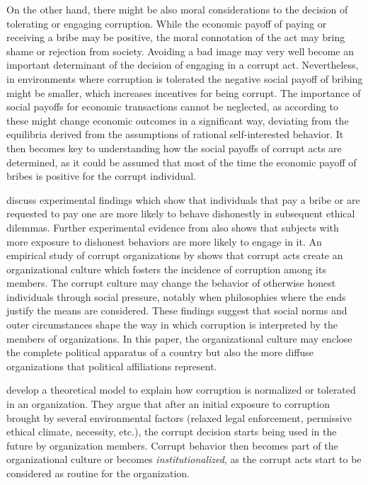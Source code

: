 \documentclass[12pt,a4]{article}\usepackage[]{graphicx}\usepackage[]{xcolor}
\begin{document}
On the other hand, there might be also moral considerations to the decision of tolerating or engaging corruption. While the economic payoff of paying or receiving a bribe may be positive, the moral connotation of the act may bring shame or rejection from society. Avoiding a bad image may very well become an important determinant of the decision of engaging in a corrupt act. Nevertheless, in environments where corruption is tolerated the negative social payoff of bribing might be smaller, which increases incentives for being corrupt. The importance of social payoffs for economic transactions cannot be neglected, as according to \textcite{Akerlof.1980} these might change economic outcomes in a significant way, deviating from the equilibria derived from the assumptions of rational self-interested behavior. It then becomes key to understanding how the social payoffs of corrupt acts are determined, as it could be assumed that most of the time the economic payoff of bribes is positive for the corrupt individual. 

\textcite{Ariely.2019} discuss experimental findings which show that individuals that pay a bribe or are requested to pay one are more likely to behave dishonestly in subsequent ethical dilemmas. Further experimental evidence from \textcite{Gino.2009} also shows that subjects with more exposure to dishonest behaviors are more likely to engage in it. An empirical study of corrupt organizations by \textcite{Campbell.2014} shows that corrupt acts create an organizational culture which fosters the incidence of corruption among its members. The corrupt culture may change the behavior of otherwise honest individuals through social pressure, notably when philosophies where the ends justify the means are considered. These findings suggest that social norms and outer circumstances shape the way in which corruption is interpreted by the members of organizations. In this paper, the organizational culture may enclose the complete political apparatus of a country but also the more diffuse organizations that political affiliations represent. 

\textcite{Ashforth.2003} develop a theoretical model to explain how corruption is normalized or tolerated in an organization. They argue that after an initial exposure to corruption brought by several environmental factors (relaxed legal enforcement, permissive ethical climate, necessity, etc.), the corrupt decision starts being used in the future by organization members. Corrupt behavior then becomes part of the organizational culture or becomes \textit{institutionalized}, as the corrupt acts start to be considered as routine for the organization.  
\end{document}
